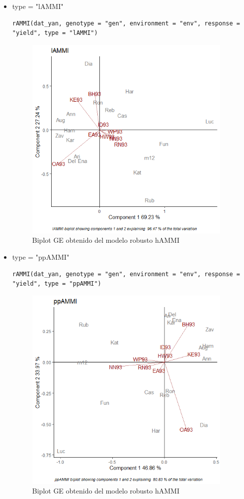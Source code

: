 \begin{itemize}
\item  type = "lAMMI"

\begin{lstlisting}
rAMMI(dat_yan, genotype = "gen", environment = "env", response = "yield", type = "lAMMI")
\end{lstlisting}


\begin{figure}[h]
	\begin{center}
		\includegraphics[width=10cm]{./Graficos/lAMMI.png}
	\end{center}
	\caption{Biplot GE obtenido del modelo robusto hAMMI}
\end{figure}


\item  type = "ppAMMI"
\begin{lstlisting}
rAMMI(dat_yan, genotype = "gen", environment = "env", response = "yield", type = "ppAMMI")
\end{lstlisting}


\begin{figure}[h]
	\begin{center}
		\includegraphics[width=10cm]{./Graficos/ppAMMI.png}
	\end{center}
	\caption{Biplot GE obtenido del modelo robusto hAMMI}
\end{figure}

\end{itemize}
